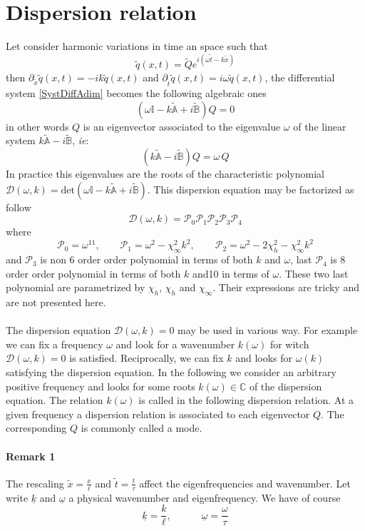 \documentclass[
10pt, %
a4paper, %
oneside, %
headinclude,footinclude, %
table
]{scrartcl}
\begin{document}
\section{Dispersion relation}
Let consider harmonic variations in time an space such that 
$$
\tilde{q}(x,t)=\tilde{Q}e^{i(\omega \tilde{t}-k\tilde{x})}
$$
then $\partial_{\tilde{x}}\tilde{q}(x,t)=-ik\tilde{q}(x,t)$ and $\partial_{\tilde{t}}\tilde{q}(x,t)=i\omega\tilde{q}(x,t)$, the differential system \ref{SystDiffAdim} becomes the following algebraic ones
\begin{equation}\label{SystDiffAdim}
\left(\omega\mathbb{I} -k\tilde{\mathbb{A}}+i\tilde{\mathbb{B}}\right)Q=0
\end{equation}
in other words $Q$ is an eigenvector associated to the eigenvalue $\omega$ of the linear system $k\tilde{\mathbb{A}}-i\tilde{\mathbb{B}}$, \textit{ie}:
$$
\left(k\tilde{\mathbb{A}}-i\tilde{\mathbb{B}}\right)Q=\omega \, Q
$$
In practice this eigenvalues are the roots of the characteristic polynomial $\mathcal{D}(\omega,k)=\textrm{det}(\omega\mathbb{I} -k\tilde{\mathbb{A}}+i\tilde{\mathbb{B}})$. This dispersion equation may be factorized as follow
$$
\mathcal{D}(\omega,k)=\mathcal{P}_{0}\mathcal{P}_{1}\mathcal{P}_{2}\mathcal{P}_{3}\mathcal{P}_{4}
$$
where 
$$
\mathcal{P}_{0}=\omega^{11}, \quad\quad
\mathcal{P}_{1}=\omega^2-\chi_{\infty}^2k^2, \quad\quad
\mathcal{P}_{2}=\omega^2-2 \chi_{h}^2-\chi_{\infty}^2k^2
$$
and $\mathcal{P}_{3}$ is non 6 order order polynomial in terms of both $k$ and $\omega$, last $\mathcal{P}_{4}$  is 8 order order polynomial in terms of both $k$ and10 in terms of $\omega$. These two last polynomial are parametrized by $\chi_{h}$, $\chi_{h}$ and $\chi_{\infty}$. Their expressions are tricky and are not presented here. \\
\\
The dispersion equation $\mathcal{D}(\omega,k)=0$ may be used in various way. For example we can fix a frequency $\omega$ and look for a wavenumber $k(\omega)$ for witch $\mathcal{D}(\omega,k)=0$ is satisfied. Reciprocally, we can fix $k$ and looks for $\omega(k)$ satisfying the dispersion equation. In the following we consider an arbitrary positive frequency and looks for some roots $k(\omega)\in \mathbb{C}$ of the dispersion equation.  The relation $k(\omega)$ is called in the following dispersion relation. At a given frequency a dispersion relation is associated to each eigenvector $Q$. The corresponding $Q$ is commonly called a mode. \\
\paragraph{\textbf{Remark 1}} The rescaling $\tilde{x}=\frac{x}{\ell}$ and $\tilde{t}=\frac{t}{\tau}$ affect the eigenfrequencies and wavenumber. Let write $\underline{k}$ and $\underline{\omega}$ a physical wavenumber and eigenfrequency.  We have of course 
$$
\underline{k}=\frac{k}{\ell}, \quad\quad\quad
\underline{\omega}=\frac{\omega}{\tau}
$$
\end{document}
